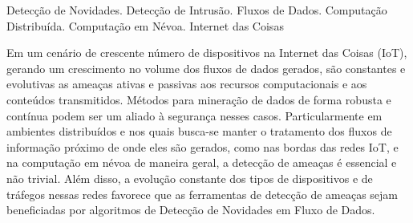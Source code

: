 \begin{resumo}{Detecção de Novidades. Detecção de Intrusão. Fluxos de Dados.
   Computação Distribuída. Computação em Névoa. Internet das Coisas}


   Em um cenário de crescente número de dispositivos na Internet das Coisas
   (IoT), gerando um crescimento %
   no volume dos fluxos de dados
   gerados,
   são constantes e evolutivas as ameaças ativas e passivas aos recursos
   computacionais e aos conteúdos transmitidos.
   Métodos para mineração de dados de forma robusta e contínua podem ser um
   aliado à segurança nesses casos.
   Particularmente em ambientes distribuídos e nos quais busca-se manter o tratamento
   dos fluxos de informação próximo de onde eles são gerados, como nas bordas das
   redes IoT, e na computação em névoa de maneira geral, a detecção de ameaças é
   essencial e não trivial.
   Além disso, a evolução constante dos tipos de dispositivos e de tráfegos
   nessas redes favorece que as ferramentas de detecção de ameaças sejam
   beneficiadas por algoritmos de Detecção de Novidades em Fluxo de Dados.

\end{resumo}

